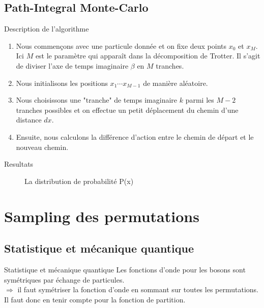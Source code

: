 \documentclass{beamer}
\begin{document}
\subsection{Path-Integral Monte-Carlo}

\begin{frame}{Description de l'algorithme}

    \begin{enumerate} 
        \item 
        Nous commençons avec une particule donnée et on fixe deux points $x_0$ et $x_M$. Ici $M$ est le paramètre qui apparaît dans la décomposition de Trotter. Il s'agit de diviser l'axe de temps imaginaire $\beta$ en $M$ tranches. 
        \item 
        Nous initialisons les positions $x_1 \cdots x_{M-1}$ de manière aléatoire. 
        \item 
        Nous choisissons une "tranche" de temps imaginaire $k$ parmi les $M-2$ tranches possibles et on effectue un petit déplacement du chemin d'une distance $dx$. 
        \item 
        Ensuite, nous calculons la différence d'action entre le chemin de départ et le nouveau chemin. 
    \end{enumerate}
    
\end{frame}

\begin{frame}{Resultats}

    \begin{figure}[!h]
        \centering
        
        \caption{La distribution de probabilité P(x)}
    \end{figure}
    
\end{frame}

\section{Sampling des permutations}
\subsection{Statistique et mécanique quantique}
    \begin{frame}{Statistique et mécanique quantique}
        Les fonctions d'onde pour les bosons sont symétriques par échange de particules.
        \\
        $\Rightarrow$ il faut symétriser la fonction d'onde en sommant sur toutes les permutations. Il faut donc en tenir compte pour la fonction de partition.
    \end{frame}
\end{document}

